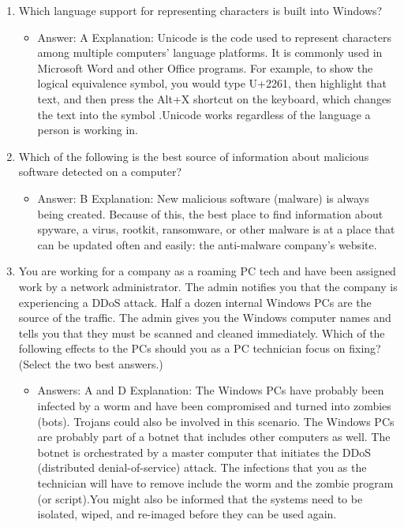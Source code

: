 \documentclass{article}
\begin{document}
\begin{enumerate}
    \item Which language support for representing characters is built into
Windows?
    \begin{itemize}
        \item Answer: A
Explanation: Unicode is the code used to represent characters among multiple computers’
language platforms. It is commonly used in Microsoft Word and other Office
programs. For example, to show the logical equivalence symbol, you would type
U+2261, then highlight that text, and then press the Alt+X shortcut on the keyboard,
which changes the text into the symbol .Unicode works regardless of the language
a person is working in.
    \end{itemize}
    \item Which of the following is the best source of information about
malicious software detected on a computer?
    \begin{itemize}
        \item Answer: B
Explanation: New malicious software (malware) is always being created. Because of
this, the best place to find information about spyware, a virus, rootkit, ransomware,
or other malware is at a place that can be updated often and easily: the anti-malware
company’s website.
    \end{itemize}
    \item You are working for a company as a roaming PC tech and have
been assigned work by a network administrator. The admin notifies
you that the company is experiencing a DDoS attack. Half a dozen
internal Windows PCs are the source of the traffic. The admin
gives you the Windows computer names and tells you that they
must be scanned and cleaned immediately. Which of the following
effects to the PCs should you as a PC technician focus on fixing?
(Select the two best answers.)
    \begin{itemize}
        \item Answers: A and D
Explanation: The Windows PCs have probably been infected by a worm and have been
compromised and turned into zombies (bots). Trojans could also be involved in this scenario.
The Windows PCs are probably part of a botnet that includes other computers as
well. The botnet is orchestrated by a master computer that initiates the DDoS (distributed
denial-of-service) attack. The infections that you as the technician will have to remove
include the worm and the zombie program (or script).You might also be informed that
the systems need to be isolated, wiped, and re-imaged before they can be used again.

\end{itemize}
\end{enumerate}
\end{document}
